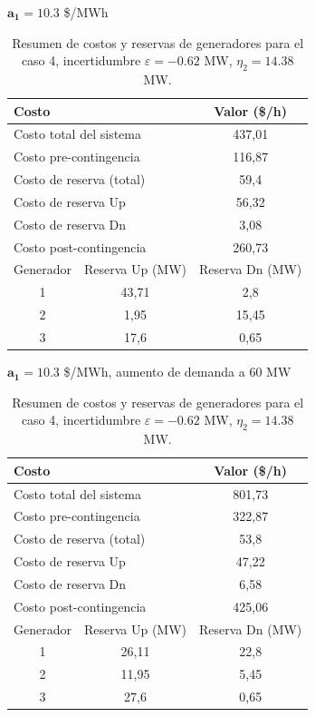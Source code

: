 \begin{frame}{$\mathbf{a_{1} = 10.3}$ \$/MWh}
\small
\begin{table}[H]
    \renewcommand{\arraystretch}{1.1}
    \centering
    \caption{Resumen de costos y reservas de generadores para el caso 4, incertidumbre $\varepsilon = -0.62$ MW, $\eta_{2} = 14.38$ MW.}
    \label{tab:res_ctos_caso4}
    \begin{tabular}{|c|c|c|}
        \hline
		\multicolumn{2}{|l|}{Costo} & Valor (\$/h) \\
		\hline
		\multicolumn{2}{|l|}{Costo total del sistema} & 437,01 \\
		\multicolumn{2}{|l|}{Costo pre-contingencia} & 116,87 \\
		\multicolumn{2}{|l|}{Costo de reserva (total)} & 59,4 \\
		\multicolumn{2}{|l|}{Costo de reserva Up} & 56,32 \\
		\multicolumn{2}{|l|}{Costo de reserva Dn} & 3,08 \\
		\multicolumn{2}{|l|}{Costo post-contingencia} & 260,73 \\
		\hline \hline
		Generador & Reserva Up (MW) & Reserva Dn (MW) \\
		\hline
		1 & 43,71 & 2,8 \\
		2 & 1,95 & 15,45 \\
		3 & 17,6 & 0,65 \\
		\hline
    \end{tabular}
\end{table}
\end{frame}

\begin{frame}{$\mathbf{a_{1} = 10.3}$ \$/MWh, aumento de demanda a 60 MW}
\small
\begin{table}[H]
    \renewcommand{\arraystretch}{1.1}
    \centering
    \caption{Resumen de costos y reservas de generadores para el caso 4, incertidumbre $\varepsilon = -0.62$ MW, $\eta_{2} = 14.38$ MW.}
    \label{tab:res_ctos_caso4}
    \begin{tabular}{|c|c|c|}
        \hline
		\multicolumn{2}{|l|}{Costo} & Valor (\$/h) \\
		\hline
		\multicolumn{2}{|l|}{Costo total del sistema} & 801,73 \\
		\multicolumn{2}{|l|}{Costo pre-contingencia} & 322,87 \\
		\multicolumn{2}{|l|}{Costo de reserva (total)} & 53,8 \\
		\multicolumn{2}{|l|}{Costo de reserva Up} & 47,22 \\
		\multicolumn{2}{|l|}{Costo de reserva Dn} & 6,58 \\
		\multicolumn{2}{|l|}{Costo post-contingencia} & 425,06 \\
		\hline \hline
		Generador & Reserva Up (MW) & Reserva Dn (MW) \\
		\hline
		1 & 26,11 & 22,8 \\
		2 & 11,95 & 5,45 \\
		3 & 27,6 & 0,65 \\
		\hline
    \end{tabular}
\end{table}
\end{frame}

